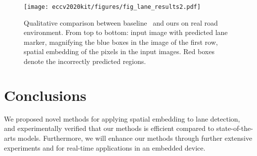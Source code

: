\documentclass[runningheads]{llncs}
\begin{document}
\begin{figure*}[ht!]
\vspace*{-0.55cm}
  \centering\texttt{[image: eccv2020kit/figures/fig\_lane\_results2.pdf]}
\vspace*{-0.15cm}
  \caption{Qualitative comparison between baseline~\cite{neven2018towards} and ours on real road environment. From top to bottom: input image with predicted lane marker, magnifying the blue boxes in the image of the first row, spatial embedding of the pixels in the input images. Red boxes denote the incorrectly predicted regions.
}
\label{fig:qualitative}
\vspace*{-0.65cm}
\end{figure*}
\vspace*{-0.42cm}
\section{Conclusions}
\vspace*{-0.18cm}
We proposed novel methods for applying spatial embedding to lane detection, and experimentally verified that our methods is efficient compared to state-of-the-arts models. Furthermore, we will enhance our methods through further extensive experiments and for real-time applications in an embedded device.
\vspace*{-0.28cm}
{\footnotesize


}
\end{document}
